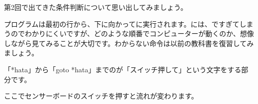 
第2回で出てきた条件判断について思い出してみましょう。

プログラムは最初の行から、下に向かってに実行されます。には、ですぎてしまうのでわかりにくいですが、どのような順番でコンピューターが動くのか、想像しながら見てみることが大切です。わからない命令は以前の教科書を復習してみましょう。
\clearpage

「*hata」から「goto *hata」までのが「スイッチ押して」という文字をする部分です。




\begin{description}
    \item {}
    \item {}
    \item {}
    \item {}
    \item {}
    \item {}
    \item {}
    \item {}
    \item {}
    \item {}
\end{description}

ここでセンサーボードのスイッチを押すと流れが変わります。

\begin{description}
    \item {}
    \item {}
    \item {}
    \item {}
    \item {}
    \item {}
    \item {}
    \item {}
    \item {}
    \item {}
\end{description}


